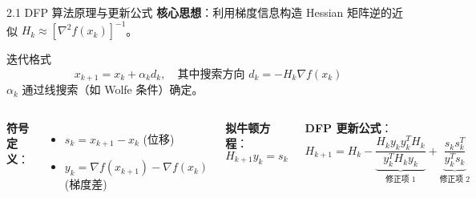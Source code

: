 \documentclass[11pt,hyperref={pdfpagelabels=false}]{beamer}
\begin{document}
\begin{frame}{2.1 DFP 算法原理与更新公式}
    \textbf{核心思想}：利用梯度信息构造 Hessian 矩阵逆的近似 $H_k \approx [\nabla^2 f(x_k)]^{-1}$。

    \vspace{0.3cm}
    \begin{block}{迭代格式}
        \begin{equation*}
            x_{k+1} = x_k + \alpha_k d_k, \quad \text{其中搜索方向 } d_k = -H_k \nabla f(x_k)
        \end{equation*}
        $\alpha_k$ 通过线搜索（如 Wolfe 条件）确定。
    \end{block}

    \vspace{0.3cm}
    \begin{columns}
        \textbf{符号定义}：
        \begin{itemize}
            \item $s_k = x_{k+1} - x_k$ (位移)
            \item $y_k = \nabla f(x_{k+1}) - \nabla f(x_k)$ (梯度差)
        \end{itemize}
        \vspace{0.2cm}
        \textbf{拟牛顿方程}：
        \begin{equation*}
            H_{k+1} y_k = s_k
        \end{equation*}

        \textbf{DFP 更新公式}：
        \begin{equation*}
            H_{k+1} = H_k - \underbrace{\frac{H_k y_k y_k^T H_k}{y_k^T H_k y_k}}_{\text{修正项 1}} + \underbrace{\frac{s_k s_k^T}{y_k^T s_k}}_{\text{修正项 2}}
        \end{equation*}
    \end{columns}
\end{frame}
\end{document}
